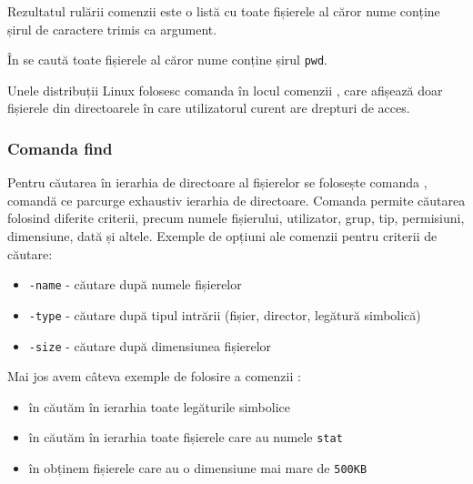 Rezultatul rulării comenzii este o listă cu toate fișierele al căror nume conține șirul de caractere trimis ca argument.

În  se caută toate fișierele al căror nume conține șirul \texttt{pwd}.


Unele distribuții Linux folosesc comanda  în locul comenzii , care afișează doar fișierele din directoarele în care utilizatorul curent are drepturi de acces.

\subsubsection{Comanda find}
\label{sec:fs:find}

Pentru căutarea în ierarhia de directoare al fișierelor se folosește comanda , comandă ce parcurge exhaustiv ierarhia de directoare.
Comanda permite căutarea folosind diferite criterii, precum numele fișierului, utilizator, grup, tip, permisiuni, dimensiune, dată și altele.
Exemple de opțiuni ale comenzii  pentru criterii de căutare:

\begin{itemize}
  \item \texttt{-name} - căutare după numele fișierelor
  \item \texttt{-type} - căutare după tipul intrării (fișier, director, legătură simbolică)
  \item \texttt{-size} - căutare după dimensiunea fișierelor
\end{itemize}

Mai jos avem câteva exemple de folosire a comenzii :

\begin{itemize}
  \item în  căutăm în ierarhia  toate legăturile simbolice
  \item în  căutăm în ierarhia  toate fișierele care au numele \texttt{stat}
  \item în  obținem fișierele care au o dimensiune mai mare de \texttt{500KB}
\end{itemize}

